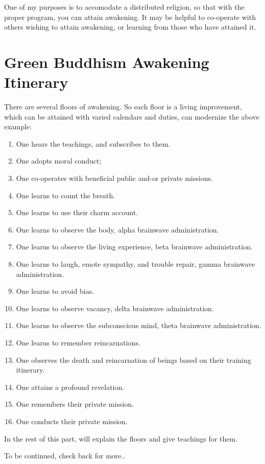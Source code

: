 One of my purposes is to accomodate a distributed religion, 
so that with the proper program, you can attain awakening.
It may be helpful to co-operate with others wishing to attain awakening,
or learning from those who have attained it.

\chapter{Green Buddhism Awakening Itinerary}
There are several floors of awakening. So each floor is a living improvement,
which can be attained with varied calendars and duties,
can modernize the above example:
\begin{enumerate}
  \item  One hears the teachings, and subscribes to them.
  \item  One adopts moral conduct;
  \item  One co-operates with beneficial public and-or private missions.
  \item  One learns to count the breath.
  \item  One learns to use their charm account.
  \item  One learns to observe the body, alpha brainwave administration.
  \item  One learns to observe the living experience, beta brainwave
administration.
  \item  One learns to laugh, emote sympathy, and trouble repair, gamma
brainwave administration.
  \item  One learns to avoid bias.
  \item  One learns to observe vacancy, delta brainwave administration.
  \item  One learns to observe the subconscious mind, theta brainwave
administration.
  \item  One learns to remember reincarnations.
  \item  One observes the death and reincarnation of beings based on their
training itinerary.
  \item  One attains a profound revelation.
  \item  One remembers their private mission.
  \item  One conducts their private mission.
\end{enumerate}

In the rest of this part, will explain the floors and give teachings for them.

To be continued, check back for more..
